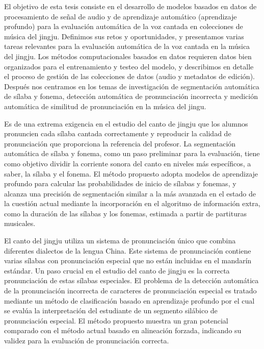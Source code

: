 El objetivo de esta tesis consiste en el desarrollo de modelos basados en datos de procesamiento de señal de audio y de aprendizaje automático (aprendizaje profundo) para la evaluación automática de la voz cantada en colecciones de música del jingju. Definimos sus retos y oportunidades, y presentamos varias tareas relevantes para la evaluación automática de la voz cantada en la música del jingju. Los métodos computacionales basados en datos requieren datos bien organizados para el entrenamiento y testeo del modelo, y describimos en detalle el proceso de gestión de las colecciones de datos (audio y metadatos de edición). Después nos centramos en los temas de investigación de segmentación automática de sílaba y fonema, detección automática de pronunciación incorrecta y medición automática de similitud de pronunciación en la música del jingu.

Es de una extrema exigencia en el estudio del canto de jingju que los alumnos pronuncien cada sílaba cantada correctamente y reproducir la calidad de pronunciación que proporciona la referencia del profesor. La segmentación automática de sílaba y fonema, como un paso preliminar para la evaluación, tiene como objetivo dividir la corriente sonora del canto en niveles más específicos, a saber, la sílaba y el fonema. El método propuesto adopta modelos de aprendizaje profundo para calcular las probabilidades de inicio de sílabas y fonemas, y alcanza una precisión de segmentación similar a la más avanzada en el estado de la cuestión actual mediante la incorporación en el algoritmo de información extra, como la duración de las sílabas y los fonemas, estimada a partir de partituras musicales.

El canto del jingju utiliza un sistema de pronunciación único que combina diferentes dialectos de la lengua China. Este sistema de pronunciación contiene varias sílabas con pronunciación especial que no están incluidas en el mandarín estándar. Un paso crucial en el estudio del canto de jingju es la correcta pronunciación de estas sílabas especiales. El problema de la detección automática de la pronunciación incorrecta de caracteres de pronunciación especial es tratado mediante un método de clasificación basado en aprendizaje profundo por el cual se evalúa la interpretación del estudiante de un segmento silábico de pronunciación especial. El método propuesto muestra un gran potencial comparado con el método actual basado en alineación forzada, indicando su validez para la evaluación de pronunciación correcta.

\vfill

